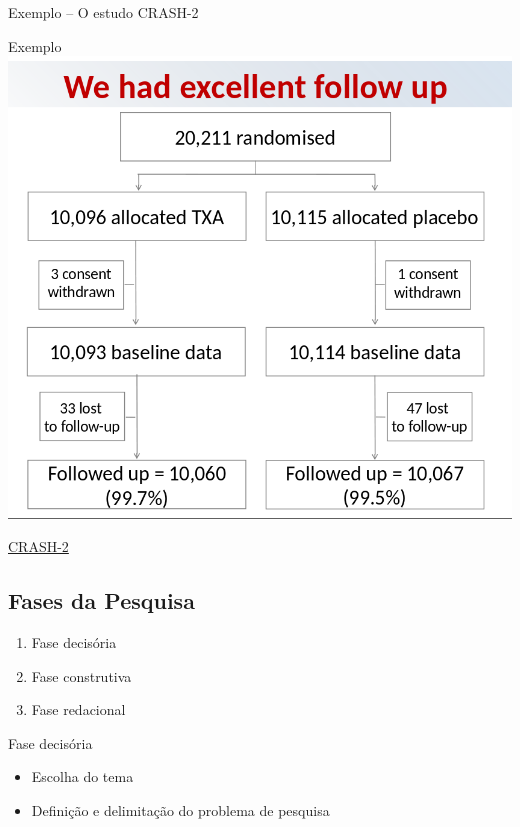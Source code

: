 \documentclass{beamer}
\begin{document}
\begin{frame}{Exemplo -- O estudo CRASH-2}
  \begin{exampleblock}{Exemplo}
    \centering
    \includegraphics[height=.8\textheight]{Planejamento/CRASH-flow}
  \end{exampleblock}
  \vfill
  \scriptsize
  \hfill \href{http://www.crash2.lshtm.ac.uk/}{CRASH-2}
\end{frame}

\subsection{Fases da Pesquisa}

\begin{frame}
  \begin{enumerate}
  \item Fase decisória
    \bigskip
  \item Fase construtiva
    \bigskip
  \item Fase redacional
  \end{enumerate}
\end{frame}

\begin{frame}{Fase decisória}
  \begin{itemize}
  \item Escolha do tema
    \bigskip
  \item Definição e delimitação do problema de pesquisa
  \end{itemize}
\end{frame}
\end{document}
